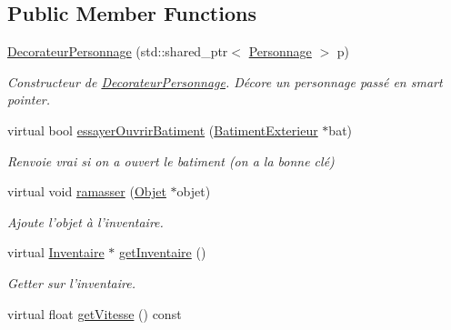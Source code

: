 \subsection*{Public Member Functions}
\begin{DoxyCompactItemize}
\item 
\hypertarget{classDecorateurPersonnage_a67c835f380688c77d9186e9d60b5870b}{\hyperlink{classDecorateurPersonnage_a67c835f380688c77d9186e9d60b5870b}{Decorateur\-Personnage} (std\-::shared\-\_\-ptr$<$ \hyperlink{classPersonnage}{Personnage} $>$ p)}\label{classDecorateurPersonnage_a67c835f380688c77d9186e9d60b5870b}

\begin{DoxyCompactList}\small\item\em Constructeur de \hyperlink{classDecorateurPersonnage}{Decorateur\-Personnage}. Décore un personnage passé en smart pointer. \end{DoxyCompactList}\item 
virtual bool \hyperlink{classDecorateurPersonnage_a2ba5d156bbeb613ded71ae60b7e85c67}{essayer\-Ouvrir\-Batiment} (\hyperlink{classBatimentExterieur}{Batiment\-Exterieur} $\ast$bat)
\begin{DoxyCompactList}\small\item\em Renvoie vrai si on a ouvert le batiment (on a la bonne clé) \end{DoxyCompactList}\item 
\hypertarget{classDecorateurPersonnage_a357339a42f783ab7d543e2c63385ec76}{virtual void \hyperlink{classDecorateurPersonnage_a357339a42f783ab7d543e2c63385ec76}{ramasser} (\hyperlink{classObjet}{Objet} $\ast$objet)}\label{classDecorateurPersonnage_a357339a42f783ab7d543e2c63385ec76}

\begin{DoxyCompactList}\small\item\em Ajoute l'objet à l'inventaire. \end{DoxyCompactList}\item 
\hypertarget{classDecorateurPersonnage_a785c105eb3c50f20b7a05f691cfa8f1b}{virtual \hyperlink{classInventaire}{Inventaire} $\ast$ \hyperlink{classDecorateurPersonnage_a785c105eb3c50f20b7a05f691cfa8f1b}{get\-Inventaire} ()}\label{classDecorateurPersonnage_a785c105eb3c50f20b7a05f691cfa8f1b}

\begin{DoxyCompactList}\small\item\em Getter sur l'inventaire. \end{DoxyCompactList}\item 
\hypertarget{classDecorateurPersonnage_a53f882d120584c22947493547ae2df6e}{virtual float \hyperlink{classDecorateurPersonnage_a53f882d120584c22947493547ae2df6e}{get\-Vitesse} () const }\label{classDecorateurPersonnage_a53f882d120584c22947493547ae2df6e}


\end{DoxyCompactItemize}
